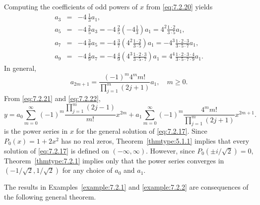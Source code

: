 \begin{examplesolution}
Computing the coefficients of odd powers of $x$ from \eqref{eq:7.2.20} yields
\begin{eqnarray*}
  a_{3} & = & -4\,\frac{1}{3}a_{1},                                                                                                              \\[5pt]
  a_{5} & = & -4\,\frac{2}{5}a_{3}=-4\,\frac{2}{5}\left(-4{\frac{1}{3}}\right)a_{1}=4^{2}\frac{1\cdot2}{3\cdot5}a_{1},                           \\[5pt]
  a_{7} & = & -4\,\frac{3}{7}a_{5}=-4\,\frac{3}{7}\left(4^{2}\frac{1\cdot2}{3\cdot5}\right)a_{1}=-4^{3}\frac{1\cdot2\cdot3}{3\cdot5\cdot7}a_{1}, \\[5pt]
  a_{9} & = & -4\,\frac{4}{9}a_{7}=-4\,\frac{4}{9}\left(4^{3}\frac{1\cdot2\cdot3}{3\cdot5\cdot7}\right)a_{1}=4^{4}\frac{1\cdot2\cdot3\cdot4}{3\cdot5\cdot7\cdot9}a_{1}.
\end{eqnarray*}
In general,
\begin{equation}
  \label{eq:7.2.22}a_{2m+1}=\frac{(-1)^{m}4^{m}m!}{\prod_{j=1}^{m}(2j+1)}a_{1},\quad m\ge0.
\end{equation}
From \eqref{eq:7.2.21} and \eqref{eq:7.2.22},
\[
  y=a_{0}\sum^{\infty}_{m=0}(-1)^{m}\frac{\prod_{j=1}^{m}(2j-1)}{m!}x^{2m}+a_{1}\sum^{\infty}_{m=0}(-1)^{m}\frac{4^{m}m!}{\prod_{j=1}^{m}(2j+1)}x^{2m+1}.
\]
is the power series in $x$ for the general solution of \eqref{eq:7.2.17}. Since $P_{0}(x)=1+2x^{2}$
has no real zeros, Theorem~\ref{thmtype:5.1.1} implies that every solution of \eqref{eq:7.2.17} is
defined on $(-\infty,\infty)$. However, since $P_{0}(\pm i/\sqrt{2})=0$, Theorem~\ref{thmtype:7.2.1}
implies only that the power series converges in $(-1/\sqrt{2},1/\sqrt{2})$ for any choice of $a_{0}$
and $a_{1}$.
\end{examplesolution}

The results in Examples~\ref{example:7.2.1} and \ref{example:7.2.2} are consequences of the
following general theorem.

